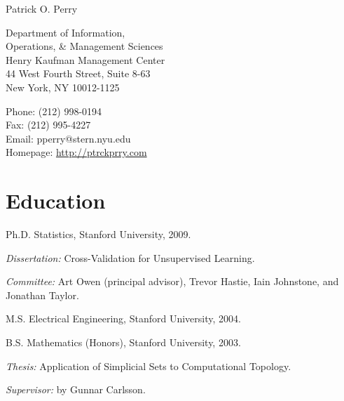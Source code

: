\documentclass[10pt,letterpaper]{article}
\def\name{Patrick O. Perry}
\renewenvironment{itemize}{
  \begin{list}{}{
    \setlength{\leftmargin}{1.5em}
    \setlength{\itemsep}{0.25em}
    \setlength{\parskip}{0pt}
    \setlength{\parsep}{0.25em}
  }
}{
  \end{list}
}
\begin{document}
\nobibliography*

{\huge \name}


\bigskip

\begin{minipage}[t]{0.5\textwidth}
  Department of Information, \\
  Operations, \& Management Sciences \\
  Henry Kaufman Management Center \\
  44 West Fourth Street, Suite 8-63 \\
  New York, NY 10012-1125
\end{minipage}
\begin{minipage}[t]{0.5\textwidth}
  Phone: (212) 998-0194 \\
  Fax: (212) 995-4227 \\
  Email: pperry@stern.nyu.edu \\
  Homepage: \href{http://ptrckprry.com/}{http://ptrckprry.com}
\end{minipage}

\section*{Education}

\begin{itemize}
  \item Ph.D. Statistics, Stanford University, 2009.
    \begin{itemize}
    \item \textit{Dissertation:}
      Cross-Validation for Unsupervised Learning.
    \item \textit{Committee:}
      Art Owen (principal advisor), Trevor Hastie,
      Iain Johnstone, and Jonathan Taylor.
    \end{itemize}
  \item M.S. Electrical Engineering, Stanford University, 2004.
  \item B.S. Mathematics (Honors),
    Stanford University, 2003.
    \begin{itemize}
    \item \textit{Thesis:}
      Application of Simplicial Sets to Computational Topology.
    \item \textit{Supervisor:} by Gunnar Carlsson.
    \end{itemize}
\end{itemize}
\end{document}
